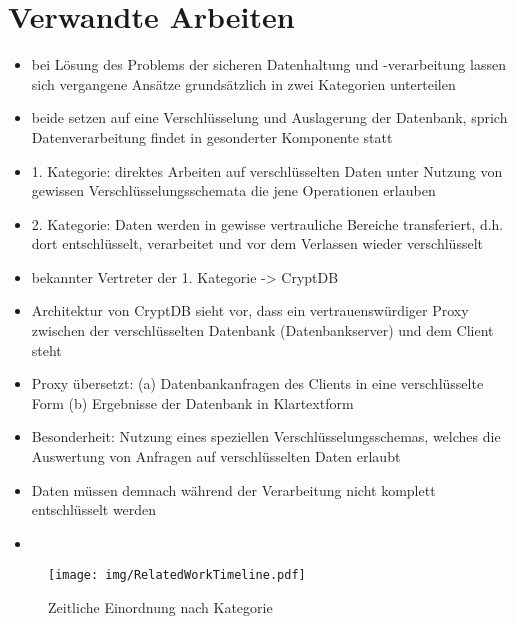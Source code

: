 \section{Verwandte Arbeiten}
\begin{itemize}
	\item bei Lösung des Problems der sicheren Datenhaltung und -verarbeitung lassen sich vergangene Ansätze grundsätzlich in zwei Kategorien unterteilen
	\item beide setzen auf eine Verschlüsselung und Auslagerung der Datenbank, sprich Datenverarbeitung findet in gesonderter Komponente statt
	\item 1. Kategorie: direktes Arbeiten auf verschlüsselten Daten unter Nutzung von gewissen Verschlüsselungsschemata die jene Operationen erlauben
	\item 2. Kategorie: Daten werden in gewisse vertrauliche Bereiche transferiert, d.h. dort entschlüsselt, verarbeitet und vor dem Verlassen wieder verschlüsselt
	
	
	\item bekannter Vertreter der 1. Kategorie -> CryptDB
	\item Architektur von CryptDB sieht vor, dass ein vertrauenswürdiger Proxy zwischen der verschlüsselten Datenbank (Datenbankserver) und dem Client steht
	\item Proxy übersetzt: (a) Datenbankanfragen des Clients in eine verschlüsselte Form (b) Ergebnisse der Datenbank in Klartextform %
	\item Besonderheit: Nutzung eines speziellen Verschlüsselungsschemas, welches die Auswertung von Anfragen auf verschlüsselten Daten erlaubt
	\item Daten müssen demnach während der Verarbeitung nicht komplett entschlüsselt werden
	\item %
\end{itemize}

\begin{figure}[h]
	\texttt{[image: img/RelatedWorkTimeline.pdf]}
	\centering
	\caption{Zeitliche Einordnung nach Kategorie}
	\label{fig:timeline}
\end{figure}
